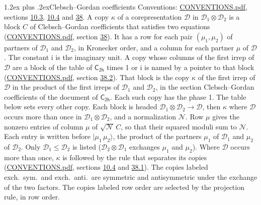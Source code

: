 \documentclass[10pt,a4paper]{article}
\makeatletter
\renewcommand\section{\@startsection{section}{1}{\z@}{-3ex plus -1ex minus -.2ex}%
  {1.2ex plus .2ex}{\normalfont\large\sffamily\bfseries\color{parttitle}}}
\numberwithin{equation}{section}
\newcommand{\grp}[1]{\mathsf{#1}}
\newcommand{\iunit}{\mathrm{i}}
\newcommand{\irrprod}{\otimes}
\newcommand{\mult}{\kappa}
\newcommand{\intx}{\mu}
\newcommand{\cgnorm}{\mathcal{N}}
\newcommand{\prodket}[2]{\lvert {#1}\,{#2}\rangle}
\makeatother
\begin{document}
\section{Clebsch--Gordan coefficients}\label{s:clebsch_gordan}
Conventions: \href{../../CONVENTIONS.pdf}{CONVENTIONS.pdf}, sections \href{../../../rotation/CONVENTIONS.pdf\#conv.10.3}{10.3}, \href{../../../rotation/CONVENTIONS.pdf\#conv.10.4}{10.4} and \href{../../CONVENTIONS.pdf\#conv.38}{38}.
\leavevmode\label{n:index.copy}\label{n:matrix.cg.stored}A copy $\mult$ of a corepresentation $\mathcal{D}$ in $\mathcal{D}_1\irrprod\mathcal{D}_2$ is a block $C$ of Clebsch--Gordan coefficients that satisfies two equations (\href{../../CONVENTIONS.pdf}{CONVENTIONS.pdf}, section \href{../../CONVENTIONS.pdf\#conv.38}{38}). \label{n:index.cg}It has a row for each pair $(\intx_1, \intx_2)$ of partners of $\mathcal{D}_1$ and $\mathcal{D}_2$, in Kronecker order, and a column for each partner $\intx$ of $\mathcal{D}$.
The constant $\iunit$ is the imaginary unit.
A copy whose columns of the first irrep of $\mathcal{D}$ are a block of the table of $\grp{C_{2h}}$ times 1 or $\iunit$ is named by a pointer to that block (\href{../../CONVENTIONS.pdf}{CONVENTIONS.pdf}, section \href{../../CONVENTIONS.pdf\#conv.38.2}{38.2}). That block is the copy $\mult$ of the first irrep of $\mathcal{D}$ in the product of the first irreps of $\mathcal{D}_1$ and $\mathcal{D}_2$, in the section Clebsch--Gordan coefficients of the document of \href{../../../rotation/data/pdf/C2h.pdf}{$\grp{C_{2h}}$}. Each such copy has the phase 1. The table below sets every other copy.
Each block is headed $\mathcal{D}_1\irrprod\mathcal{D}_2\to\mathcal{D}$, then $\mult$ where $\mathcal{D}$ occurs more than once in $\mathcal{D}_1\irrprod\mathcal{D}_2$, and a normalization $\cgnorm$. Row $\intx$ gives the nonzero entries of column $\intx$ of $\sqrt{\cgnorm}\,C$, so that their squared moduli sum to $\cgnorm$. \label{n:vector.ket.product}Each entry is written before $\prodket{\intx_1}{\intx_2}$, the product of the partners $\intx_1$ of $\mathcal{D}_1$ and $\intx_2$ of $\mathcal{D}_2$. Only $\mathcal{D}_1 \le \mathcal{D}_2$ is listed ($\mathcal{D}_2\irrprod\mathcal{D}_1$ exchanges $\intx_1$ and $\intx_2$).
Where $\mathcal{D}$ occurs more than once, $\mult$ is followed by the rule that separates its copies (\href{../../CONVENTIONS.pdf}{CONVENTIONS.pdf}, sections \href{../../../rotation/CONVENTIONS.pdf\#conv.10.4}{10.4} and \href{../../CONVENTIONS.pdf\#conv.38.1}{38.1}). \label{n:abbreviation.exchange}The copies labeled exch.\ sym.\ and exch.\ anti.\ are symmetric and antisymmetric under the exchange of the two factors. The copies labeled row order are selected by the projection rule, in row order.
\end{document}
